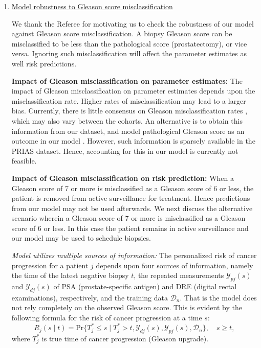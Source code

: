\begin{enumerate}
			\item \underline{Model robustness to Gleason score misclassification}

			We thank the Referee for motivating us to check the robustness of our model against Gleason score misclassification. A biopsy Gleason score can be misclassified to be less than the pathological score (prostatectomy), or vice versa. Ignoring such misclassification will affect the parameter estimates as well risk predictions. 

			\textbf{Impact of Gleason misclassification on parameter estimates:}
			The impact of Gleason misclassification on parameter estimates depends upon the misclassification rate. Higher rates of misclassification may lead to a larger bias. Currently, there is little consensus on Gleason misclassification rates \citep{cookson1997, Ploussard2010,Lattouf2002, Melia2006, Pinthus2006}, which may also vary between the cohorts. An alternative is to obtain this information from our dataset, and model pathological Gleason score as an outcome in our model \citep{balasubramanian2003estimation, coley2017}. However, such information is sparsely available in the PRIAS dataset. Hence, accounting for this in our model is currently not feasible.

			\textbf{Impact of Gleason misclassification on risk prediction:}
			When a Gleason score of 7 or more is misclassified as a Gleason score of 6 or less, the patient is removed from active surveillance for treatment. Hence predictions from our model may not be used afterwards. We next discuss the alternative scenario wherein a Gleason score of 7 or more is misclassified as a Gleason score of 6 or less. In this case the patient remains in active surveillance and our model may be used to schedule biopsies.

			\textit{Model utilizes multiple sources of information:} The personalized risk of cancer progression for a patient $j$ depends upon four sources of information, namely the time of the latest negative biopsy $t$, the repeated measurements  $\mathcal{Y}_{pj}(s)$ and $\mathcal{Y}_{dj}(s)$ of PSA (prostate-specific antigen) and DRE (digital rectal examinations), respectively, and the training data $\mathcal{D}_n$. That is the model does not rely completely on the observed Gleason score. This is evident by the following formula for the risk of cancer progression at a time $s$:
			\begin{equation}
				\label{eq:dynamic_risk_prob}
				R_j(s \mid t) = \mbox{Pr}\big\{T^*_j \leq s \mid T^*_j > t, \mathcal{Y}_{dj}(s), \mathcal{Y}_{pj}(s), \mathcal{D}_n\big\}, \quad s \geq t,
			\end{equation}
			where $T^*_j$ is true time of cancer progression (Gleason upgrade). 


\end{enumerate}
